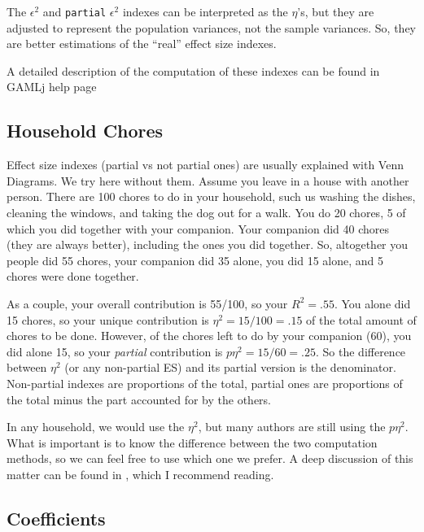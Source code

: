\documentclass[
]{book}
\begin{document}
The \(\epsilon^2\) and \texttt{partial} \(\epsilon^2\) indexes can be interpreted as the \(\eta\)'s, but they are adjusted to represent the population variances, not the sample variances. So, they are better estimations of the ``real'' effect size indexes.

A detailed description of the computation of these indexes can be found in GAMLj help page

\hypertarget{household-chores}{%
\subsection{Household Chores}\label{household-chores}}

Effect size indexes (partial vs not partial ones) are usually explained with Venn Diagrams. We try here without them. Assume you leave in a house with another person. There are 100 chores to do in your household, such us washing the dishes, cleaning the windows, and taking the dog out for a walk. You do 20 chores, 5 of which you did together with your companion. Your companion did 40 chores (they are always better), including the ones you did together. So, altogether you people did 55 chores, your companion did 35 alone, you did 15 alone, and 5 chores were done together.

As a couple, your overall contribution is 55/100, so your \(R^2=.55\). You alone did 15 chores, so your unique contribution is \(\eta^2=15/100=.15\) of the total amount of chores to be done. However, of the chores left to do by your companion (60), you did alone 15, so your \emph{partial} contribution is \(p\eta^2=15/60=.25\). So the difference between \(\eta^2\) (or any non-partial ES) and its partial version is the denominator. Non-partial indexes are proportions of the total, partial ones are proportions of the total minus the part accounted for by the others.

In any household, we would use the \(\eta^2\), but many authors are still using the \(p\eta^2\). What is important is to know the difference between the two computation methods, so we can feel free to use which one we prefer. A deep discussion of this matter can be found in \citet{olejnik2003generalized}, which I recommend reading.

\hypertarget{coefficients}{%
\subsection{Coefficients}\label{coefficients}}
\end{document}

